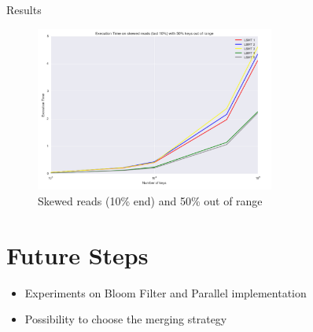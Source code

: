 \documentclass[pdf]{beamer}
\begin{document}
\begin{frame}{Results}
\begin{figure}[H]
\begin{center}
    \includegraphics[width=0.7\textwidth]{reads_skout}
    \caption{Skewed reads (10\% end) and 50\% out of range}
\end{center}
\end{figure}

\end{frame}


\section{Future Steps}

\begin{frame}
\begin{itemize}
	\item Experiments on Bloom Filter and Parallel implementation
	\item Possibility to choose the merging strategy
\end{itemize}
\end{frame}
\end{document}

